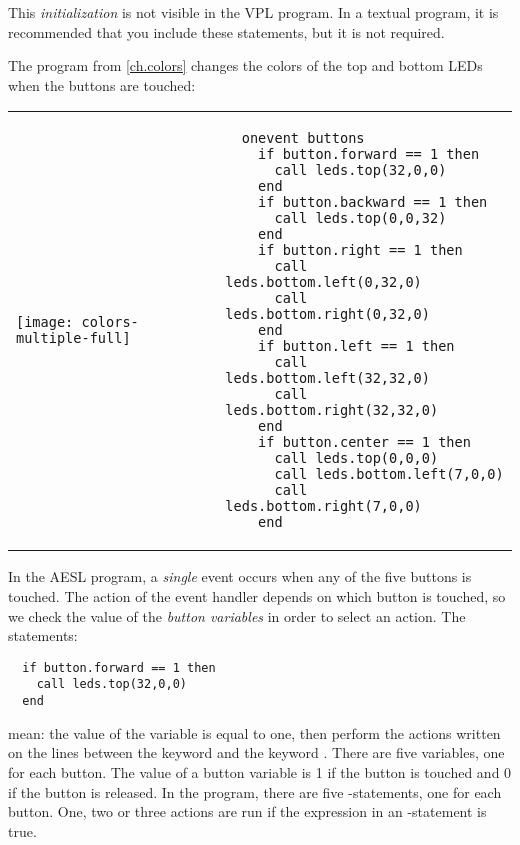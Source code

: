 This \emph{initialization} is not visible in the VPL program. In a
textual program, it is recommended that you include these statements,
but it is not required.



The program  from \cref{ch.colors} changes the
colors of the top and bottom LEDs when the buttons are touched:

\begin{center}
\begin{tabular}{ll}
\texttt{[image: colors-multiple-full]} &
\begin{minipage}[b]{.5\textwidth}
\begin{footnotesize}
\begin{verbatim}
  onevent buttons
    if button.forward == 1 then
      call leds.top(32,0,0)
    end
    if button.backward == 1 then
      call leds.top(0,0,32)
    end
    if button.right == 1 then
      call leds.bottom.left(0,32,0)
      call leds.bottom.right(0,32,0)
    end
    if button.left == 1 then
      call leds.bottom.left(32,32,0)
      call leds.bottom.right(32,32,0)
    end
    if button.center == 1 then
      call leds.top(0,0,0)
      call leds.bottom.left(7,0,0)
      call leds.bottom.right(7,0,0)
    end
\end{verbatim}
\end{footnotesize}
\vspace*{5ex}
\end{minipage}
\end{tabular}
\end{center}

In the AESL program, a \emph{single} event occurs when any of the five
buttons is touched. The action of the event handler 
depends on which button is touched, so we check the value of the
\emph{button variables} in order to select an action. The statements:

\begin{footnotesize}
\begin{verbatim}
  if button.forward == 1 then
    call leds.top(32,0,0)
  end
\end{verbatim}
\end{footnotesize}

mean:  the value of the variable  is equal to
one, then perform the actions written on the lines between the keyword
 and the keyword . There are five  variables,
one for each button. The value of a button variable is 1 if the button
is touched and 0 if the button is released. In the program, there are
five -statements, one for each button. One, two or three actions
are run if the expression in an -statement is true.

